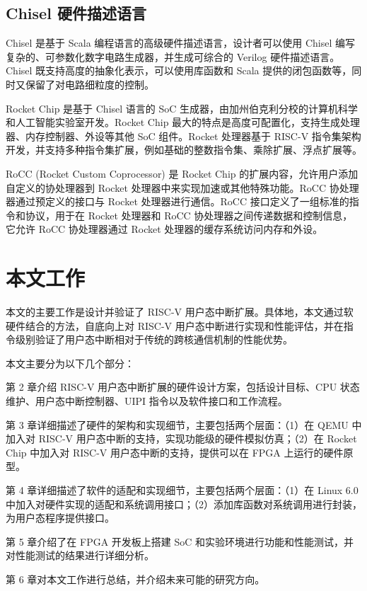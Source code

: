 \subsection{Chisel 硬件描述语言}

Chisel \cite{chisel} 是基于 Scala 编程语言的高级硬件描述语言，设计者可以使用 Chisel 编写复杂的、可参数化数字电路生成器，并生成可综合的 Verilog 硬件描述语言。Chisel 既支持高度的抽象化表示，可以使用库函数和 Scala 提供的闭包函数等，同时又保留了对电路细粒度的控制。

Rocket Chip 是基于 Chisel 语言的 SoC 生成器，由加州伯克利分校的计算机科学和人工智能实验室开发。Rocket Chip 最大的特点是高度可配置化，支持生成处理器、内存控制器、外设等其他 SoC 组件。Rocket 处理器基于 RISC-V 指令集架构开发，并支持多种指令集扩展，例如基础的整数指令集、乘除扩展、浮点扩展等。

RoCC (Rocket Custom Coprocessor) \cite{rocc} 是 Rocket Chip 的扩展内容，允许用户添加自定义的协处理器到 Rocket 处理器中来实现加速或其他特殊功能。RoCC 协处理器通过预定义的接口与 Rocket 处理器进行通信。RoCC 接口定义了一组标准的指令和协议，用于在 Rocket 处理器和 RoCC 协处理器之间传递数据和控制信息，它允许 RoCC 协处理器通过 Rocket 处理器的缓存系统访问内存和外设。


\section{本文工作}

本文的主要工作是设计并验证了 RISC-V 用户态中断扩展。具体地，本文通过软硬件结合的方法，自底向上对 RISC-V 用户态中断进行实现和性能评估，并在指令级别验证了用户态中断相对于传统的跨核通信机制的性能优势。

本文主要分为以下几个部分：

第 2 章介绍 RISC-V 用户态中断扩展的硬件设计方案，包括设计目标、CPU 状态维护、用户态中断控制器、UIPI 指令以及软件接口和工作流程。

第 3 章详细描述了硬件的架构和实现细节，主要包括两个层面：（1）在 QEMU 中加入对 RISC-V 用户态中断的支持，实现功能级的硬件模拟仿真；（2）在 Rocket Chip 中加入对 RISC-V 用户态中断的支持，提供可以在 FPGA 上运行的硬件原型。

第 4 章详细描述了软件的适配和实现细节，主要包括两个层面：（1）在 Linux 6.0 中加入对硬件实现的适配和系统调用接口；（2）添加库函数对系统调用进行封装，为用户态程序提供接口。

第 5 章介绍了在 FPGA 开发板上搭建 SoC 和实验环境进行功能和性能测试，并对性能测试的结果进行详细分析。

第 6 章对本文工作进行总结，并介绍未来可能的研究方向。
